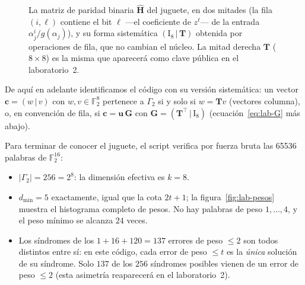 \documentclass[11pt,a4paper,oneside]{report}
\makeatletter
\newcommand{\F}{\mathbb{F}}
\newcommand{\Hmat}{\mathbf{H}}          %
\newcommand{\Gmat}{\mathbf{G}}          %
\newcommand{\Tmat}{\mathbf{T}}          %
\newcommand{\vc}{\mathbf{c}}
\newcommand{\vu}{\mathbf{u}}
\newcommand{\bit}{\{0,1\}}
\newcommand{\Ftwo}{\F_2}
\newcommand{\Bcell}[2]{\draw[bit!35,line width=0.15pt] (#1*0.155,-#2*0.155) rectangle ++(0.155,0.155);}
\newcommand{\Bfill}[2]{\fill[mcblue] (#1*0.155,-#2*0.155) rectangle ++(0.155,0.155);}
\newcounter{bitpos}
\newcommand{\bitsrow}[2]{%
  \setcounter{bitpos}{-1}%
  \@for\bit:=#2\do{%
    \stepcounter{bitpos}%
    \Bcell{\value{bitpos}}{#1}%
    \ifnum\bit=1 \Bfill{\value{bitpos}}{#1}\fi
  }%
}
\makeatother
\begin{document}
\begin{figure}[htbp]
\caption{La matriz de paridad binaria $\hat{\Hmat}$ del juguete, en dos
mitades (la fila $(i,\ell)$ contiene el bit $\ell$ —el coeficiente de
$z^\ell$— de la entrada $\alpha_j^i/g(\alpha_j)$), y su forma
sistemática $(\mathrm{I}_8\,|\,\Tmat)$ obtenida por operaciones de fila,
que no cambian el núcleo. La mitad derecha $\Tmat$ ($8\times8$) es la
misma que aparecerá como clave pública en el laboratorio~2.}
\label{fig:lab-hat}
\end{figure}

De aquí en adelante identificamos el código con su versión sistemática:
un vector $\vc=(w\,|\,v)$ con $w,v\in\Ftwo^8$ pertenece a $\Gamma_2$ si y
solo si $w=\Tmat v$ (vectores columna), o, en convención de fila, si
$\vc=\vu\,\Gmat$ con $\Gmat=(\Tmat^{\top}\,|\,\mathrm{I}_8)$
(ecuación~\eqref{eq:lab-G} más abajo).

Para terminar de conocer el juguete, el script verifica por fuerza bruta
las \num{65536} palabras de $\Ftwo^{16}$:
\begin{itemize}[leftmargin=1.4em,itemsep=2pt]
  \item $|\Gamma_2|=\num{256}=2^8$: la dimensión efectiva es $k=8$.
  \item $d_{\min}=5$ exactamente, igual que la cota $2t+1$; la
        figura~\ref{fig:lab-pesos} muestra el histograma completo de
        pesos. No hay palabras de peso $1,\dots,4$, y el peso mínimo se
        alcanza $24$ veces.
  \item Los síndromes de los $1+16+120=137$ errores de peso $\le2$ son
        todos distintos entre sí: en este código, cada error de peso
        $\le t$ es la \emph{única} solución de su síndrome. Solo $137$
        de los $256$ síndromes posibles vienen de un error de peso
        $\le2$ (esta asimetría reaparecerá en el laboratorio~2).
\end{itemize}
\end{document}
